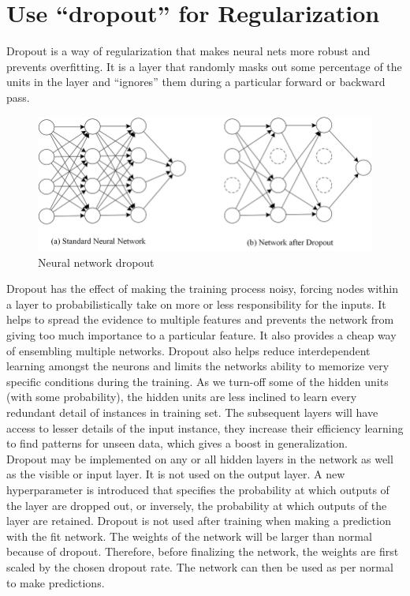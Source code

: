\section{Use “dropout” for Regularization}
Dropout is a way of regularization that makes neural nets more robust and prevents overfitting. It is a layer that randomly masks out some percentage of the units in the layer and “ignores” them during a particular forward or backward pass.\\

\begin{figure}[ht]
\centering
\includegraphics[width=120mm]{lectures/02-b/Dropout.png}
\caption{Neural network dropout}
\label{fig:dropout}
\end{figure}

Dropout has the effect of making the training process noisy, forcing nodes within a layer to probabilistically take on more or less responsibility for the inputs. It helps to spread the evidence to multiple features and prevents the network from giving too much importance to a particular feature. It also provides a cheap way of ensembling multiple networks. Dropout also helps reduce interdependent learning amongst the neurons and limits the networks ability to memorize very specific conditions during the training. As we turn-off some of the hidden units (with some probability), the hidden units are less inclined to learn every redundant detail of instances in training set. The subsequent layers will have access to lesser details of the input instance, they increase their efficiency learning to find patterns for unseen data, which gives a boost in generalization.\\

Dropout may be implemented on any or all hidden layers in the network as well as the visible or input layer. It is not used on the output layer. A new hyperparameter is introduced that specifies the probability at which outputs of the layer are dropped out, or inversely, the probability at which outputs of the layer are retained. Dropout is not used after training when making a prediction with the fit network. The weights of the network will be larger than normal because of dropout. Therefore, before finalizing the network, the weights are first scaled by the chosen dropout rate. The network can then be used as per normal to make predictions.\\

